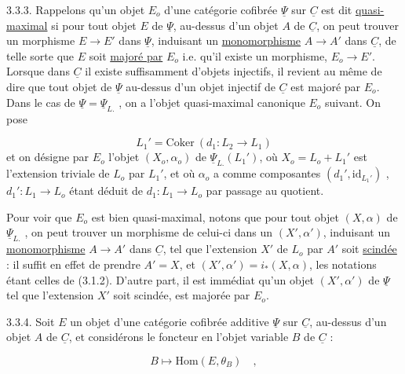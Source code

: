 
3.3.3. Rappelons qu'un objet $E_o$ d'une catégorie cofibrée $\underline{\Psi}$ sur $\underline{C}$ est dit \underline{quasi-maximal} si pour tout objet $E$ de $\underline{\Psi}$, au-dessus d'un objet $A$ de $\underline{C}$, on peut trouver un morphisme $E \longrightarrow E'$ dans $\underline{\Psi}$, induisant un \underline{monomorphisme} $A \longrightarrow A'$ dans $\underline{C}$, de telle sorte que $E$ soit \underline{majoré par} $E_o$ i.e. qu'il existe un morphisme, $E_o \longrightarrow E'$. Lorsque dans $\underline{C}$ il existe suffisamment d'objets injectifs, il revient au même de dire que tout objet de $\underline{\Psi}$ au-dessus d'un objet injectif de $\underline{C}$ est majoré par $E_o$. Dans le cas de $\underline{\Psi} = \underline{\Psi}_{L.}$ , on a l'objet quasi-maximal canonique $E_o$ suivant. On pose

\begin{equation*}
L_1' = \mathrm{Coker}\ (d_1 : L_2 \longrightarrow L_1)
\end{equation*}
et on désigne par $E_o$ l'objet $(X_o,\alpha_o)$ de $\underline{\Psi}_{L.}(L_1')$, où $X_o = L_o + L_1'$ est l'extension triviale de $L_o$ par $L_1'$, et où $\alpha_o$ a comme composantes $(d_1',\mathrm{id}_{L_1'})$ , $d_1' : L_1 \longrightarrow L_o$ étant déduit de $d_1 : L_1 \longrightarrow L_o$ par passage au quotient.

Pour voir que $E_o$ est bien quasi-maximal, notons que pour tout objet $(X,\alpha)$ de $\underline{\Psi}_{L.}$ , on peut trouver un morphisme de celui-ci dans un $(X',\alpha')$, induisant un \underline{monomorphisme} $A \longrightarrow A'$ dans $\underline{C}$, tel que l'extension $X'$ de $L_o$ par $A'$ soit \underline{scindée} : il suffit en effet de prendre $A'=X$, et $(X',\alpha') = i_*(X,\alpha)$, les notations étant celles de (3.1.2). D'autre part, il est immédiat qu'un objet $(X',\alpha')$ de $\underline{\Psi}$ tel que l'extension $X'$ soit scindée, est majorée par $E_o$.

3.3.4. Soit $E$ un objet d'une catégorie cofibrée additive $\underline{\Psi}$ sur $\underline{C}$, au-dessus d'un objet $A$ de $\underline{C}$, et considérons le foncteur en l'objet variable $B$ de $\underline{C}$ :

\begin{equation}\tag{3.3.4.1}
B \longmapsto \mathrm{Hom}(E,\theta_B) \quad , 
\end{equation}

